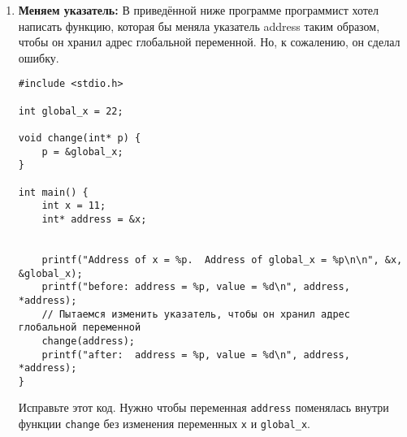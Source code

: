 \documentclass{article}
\begin{document}
\begin{enumerate}
\begin{enumerate}
\item \textbf{Меняем указатель:} 
В приведённой ниже программе программист хотел написать функцию, которая бы меняла указатель address таким образом, чтобы он хранил адрес глобальной переменной. Но, к сожалению, он сделал ошибку.
\begin{lstlisting}
#include <stdio.h>

int global_x = 22; 

void change(int* p) { 
    p = &global_x; 
} 
  
int main() { 
    int x = 11; 
    int* address = &x;
  
    
    printf("Address of x = %p.  Address of global_x = %p\n\n", &x, &global_x);
    printf("before: address = %p, value = %d\n", address, *address);
    // Пытаемся изменить указатель, чтобы он хранил адрес глобальной переменной
    change(address);
    printf("after:  address = %p, value = %d\n", address, *address);
} 
\end{lstlisting}
Исправьте этот код. Нужно чтобы переменная \texttt{address} поменялась внутри функции \texttt{change} без изменения переменных \texttt{x} и \texttt{global\_x}.
\end{enumerate}


\end{enumerate}
\end{document}
